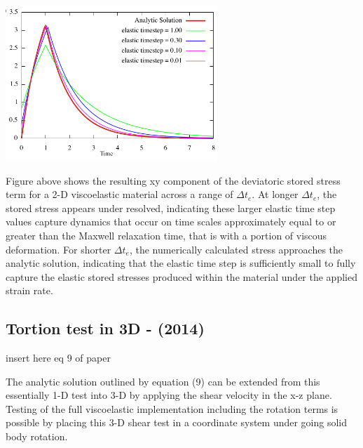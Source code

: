 \begin{center}
\includegraphics[width=8cm]{images/viscoelasticity/famc14a}\\
\end{center}

Figure above shows the resulting xy component of the deviatoric stored stress term for a 2-D viscoelastic material across a range of $\Delta t_e$. 
At longer $\Delta t_e$, the stored stress appears under resolved, indicating these larger elastic time step values capture dynamics that occur on time scales approximately equal to or greater than the Maxwell relaxation time, that is with a portion of viscous deformation. For shorter $\Delta t_e$,
the numerically calculated stress approaches the analytic solution, indicating that the elastic time step is
sufficiently small to fully capture the elastic stored stresses produced within the material under the
applied strain rate.







\subsection{Tortion test in 3D - \textcite{famc14} (2014)}

insert here eq 9 of paper

The analytic solution outlined by equation (9) can be extended from this 
essentially 1-D test into 3-D by applying the shear velocity in the x-z plane. 
Testing of the full viscoelastic implementation including the
rotation terms is possible by placing this 3-D shear test in a 
coordinate system under going solid body rotation. 

